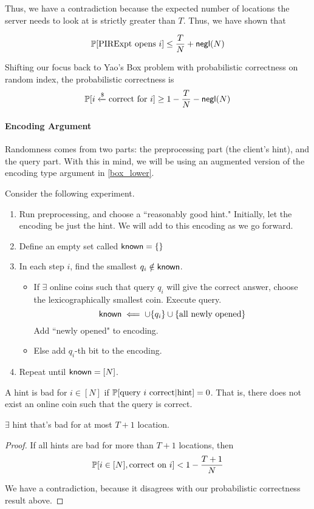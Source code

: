 Thus, we have a contradiction because the expected number of locations the server needs to look at is strictly greater than $T$. Thus, we have shown that 

\[\mathbb{P}[\text{PIRExpt opens $i$}] \le \frac{T}{N} + {\sf negl}(N)\]

\vspace{5mm}

Shifting our focus back to Yao's Box problem with probabilistic correctness on random index, the probabilistic correctness is
\[\mathbb{P}[i \xleftarrow{\$} \text{correct for $i$}] \ge 1 - \frac{T}{N} - {\sf negl}(N)\]

\paragraph{Encoding Argument}
Randomness comes from two parts: the preprocessing part (the client's hint), and the query part. With this in mind, we will be using an augmented version of the encoding type argument in \ref{box_lower}.

Consider the following experiment.
\begin{enumerate}
    \item Run preprocessing, and choose a ``reasonably good hint." Initially, let the encoding be just the hint. We will add to this encoding as we go forward.
    \item Define an empty set called ${\sf known} = \{\}$
    \item In each step $i$, find the smallest $q_i \notin {\sf known}$. 
    \begin{itemize}
        \item If $\exists$ online coins such that query $q_i$ will give the correct answer, choose the lexicographically smallest coin. Execute query.
        \[{\sf known} \impliedby \cup \{q_i\} \cup \{\text{all newly opened}\}\]
        Add ``newly opened" to encoding.
        \item Else add $q_i$-th bit to the encoding.
    \end{itemize}
    \item Repeat until ${\sf known} = [N]$.
    
\end{enumerate}

A hint is bad for $i \in [N]$ if $\mathbb{P}[\text{query $i$ correct} | \text{hint}] = 0$. That is, there does not exist an online coin such that the query is correct.

\begin{claim}
    $\exists$ hint that's bad for at most $T + 1$ location.
\end{claim}
\begin{proof}
    If all hints are bad for  more than $T+1$ locations, then
    \[\mathbb{P}[i \in [N], \text{correct on $i$}] < 1 - \frac{T+1}{N}\]

    We have a contradiction, because it disagrees with our probabilistic correctness result above.
\end{proof}

